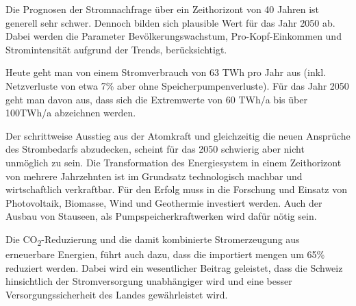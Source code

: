 Die Prognosen der Stromnachfrage über ein Zeithorizont von 40 Jahren ist generell sehr schwer\cite{eth_energiezukunft_schweiz}.
Dennoch bilden sich plausible Wert für das Jahr 2050 ab. Dabei werden die Parameter Bevölkerungswachstum,
Pro-Kopf-Einkommen und Stromintensität aufgrund der Trends, berücksichtigt.
\par
Heute geht man von einem Stromverbrauch von 63 TWh pro Jahr aus (inkl. Netzverluste von etwa 7\% aber
ohne Speicherpumpenverluste). Für das Jahr 2050 geht man davon aus, dass sich die Extremwerte von
60 TWh/a bis über 100TWh/a abzeichnen werden.
\par
Der schrittweise Ausstieg aus der Atomkraft und gleichzeitig die neuen Ansprüche des Strombedarfs abzudecken,
scheint für das 2050 schwierig aber nicht unmöglich zu sein. Die Transformation des Energiesystem in einem
Zeithorizont von mehrere Jahrzehnten ist im Grundsatz technologisch machbar und wirtschaftlich verkraftbar.
Für den Erfolg muss in die Forschung und Einsatz von Photovoltaik, Biomasse, Wind und Geothermie investiert werden.
Auch der Ausbau von Stauseen, als Pumpspeicherkraftwerken wird dafür nötig sein.
\par
Die CO\textsubscript{2}-Reduzierung und die damit kombinierte Stromerzeugung aus erneuerbare Energien, führt auch dazu,
dass die importiert mengen um 65\% reduziert werden. Dabei wird ein wesentlicher Beitrag geleistet, dass die Schweiz
hinsichtlich der Stromversorgung unabhängiger wird und eine besser  Versorgungssicherheit des Landes gewährleistet wird.
 



\section{}






